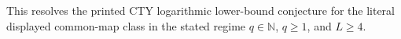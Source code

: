 This resolves the printed CTY logarithmic lower-bound conjecture for the literal displayed common-map class in the stated regime \(q\in\mathbb N\), \(q\geq1\), and \(L\geq4\).